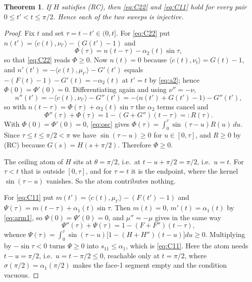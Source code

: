 \documentclass[11pt]{article}
\newtheorem{theorem}{Theorem}
\theoremstyle{definition}
\begin{document}
\begin{theorem}\label{thm:rc}
If $H$ satisfies (RC), then \eqref{eq:C22} and \eqref{eq:C11} hold for every pair
$0\le t'<t\le\pi/2$. Hence each of the two sweeps is injective.
\end{theorem}

\begin{proof}
Fix $t$ and set $\tau=t-t'\in(0,t]$. For \eqref{eq:C22} put
$n(t')=\langle c(t),\nu_{t'}\rangle-(G(t')-1)$ and
\[
  \Phi(\tau)=n(t-\tau)-\alpha_2(t)\sin\tau ,
\]
so that \eqref{eq:C22} reads $\Phi\ge0$. Now $n(t)=0$ because
$\langle c(t),\nu_t\rangle=G(t)-1$, and
$n'(t')=-\langle c(t),\mu_{t'}\rangle-G'(t')$ equals $-(F(t)-1)-G'(t)=-\alpha_2(t)$ at
$t'=t$ by \eqref{eq:a2}; hence $\Phi(0)=\Phi'(0)=0$. Differentiating again and using
$\nu''=-\nu$,
\[
  n''(t')=-\langle c(t),\nu_{t'}\rangle-G''(t')
        =-\bigl(n(t')+G(t')-1\bigr)-G''(t') ,
\]
so with $n(t-\tau)=\Phi(\tau)+\alpha_2(t)\sin\tau$ the $\alpha_2$ terms cancel and
\begin{equation}\label{eq:osc}
  \Phi''(\tau)+\Phi(\tau)=1-(G+G'')(t-\tau)=:R(\tau).
\end{equation}
With $\Phi(0)=\Phi'(0)=0$, \eqref{eq:osc} gives
$\Phi(\tau)=\int_0^\tau\sin(\tau-u)R(u)\,du$. Since $\tau\le t\le\pi/2<\pi$ we have
$\sin(\tau-u)\ge0$ for $u\in[0,\tau]$, and $R\ge0$ by (RC) because
$G(s)=H(s+\pi/2)$. Therefore $\Phi\ge0$.

The ceiling atom of $H$ sits at $\theta=\pi/2$, i.e.\ at $t-u+\pi/2=\pi/2$, i.e.\ $u=t$.
For $\tau<t$ that is outside $[0,\tau]$, and for $\tau=t$ it is the endpoint, where the
kernel $\sin(\tau-u)$ vanishes. So the atom contributes nothing.

For \eqref{eq:C11} put $m(t')=\langle c(t),\mu_{t'}\rangle-(F(t')-1)$ and
$\Psi(\tau)=m(t-\tau)+\alpha_1(t)\sin\tau$. Then $m(t)=0$, $m'(t)=\alpha_1(t)$ by
\eqref{eq:arm1}, so $\Psi(0)=\Psi'(0)=0$, and $\mu''=-\mu$ gives in the same way
\[
  \Psi''(\tau)+\Psi(\tau)=1-(F+F'')(t-\tau),
\]
whence $\Psi(\tau)=\int_0^\tau\sin(\tau-u)\bigl[1-(H+H'')(t-u)\bigr]du\ge0$. Multiplying
by $-\sin\tau<0$ turns $\Psi\ge0$ into $s_{11}\le\alpha_1$, which is \eqref{eq:C11}. Here
the atom needs $t-u=\pi/2$, i.e.\ $u=t-\pi/2\le0$, reachable only at $t=\pi/2$, where
$\sigma(\pi/2)=\alpha_1(\pi/2)$ makes the face-1 segment empty and the condition vacuous.
\end{proof}
\end{document}
